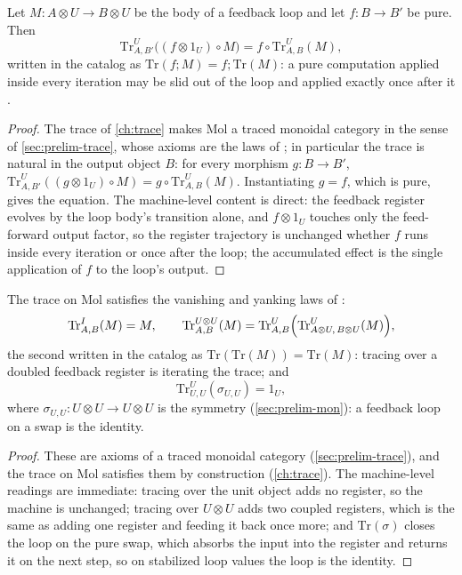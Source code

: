 \begin{theorem}[Sliding (NT34)]\label{nt:34}
Let $M : A \otimes U \to B \otimes U$ be the body of a feedback loop and let
$f : B \to B'$ be pure. Then
\[
\mathrm{Tr}^{U}_{A,B'}\bigl((f \otimes 1_U) \circ M\bigr)
= f \circ \mathrm{Tr}^{U}_{A,B}(M) ,
\]
written in the catalog as $\mathrm{Tr}(f;M) = f;\mathrm{Tr}(M)$: a pure
computation applied inside every iteration may be slid out of the loop and
applied exactly once after it \citep{joyalsv}.
\end{theorem}

\begin{proof}
The trace of \autoref{ch:trace} makes Mol a traced monoidal category in the
sense of \autoref{sec:prelim-trace}, whose axioms are the laws of
\citet{joyalsv}; in particular the trace is natural in the output object
$B$: for every morphism $g : B \to B'$,
$\mathrm{Tr}^{U}_{A,B'}((g \otimes 1_U) \circ M) = g \circ
\mathrm{Tr}^{U}_{A,B}(M)$. Instantiating $g = f$, which is pure, gives the
equation. The machine-level content is direct: the feedback register
evolves by the loop body's transition alone, and $f \otimes 1_U$ touches
only the feed-forward output factor, so the register trajectory is
unchanged whether $f$ runs inside every iteration or once after the loop;
the accumulated effect is the single application of $f$ to the loop's
output.
\end{proof}

\begin{theorem}\label{nt:35}
The trace on Mol satisfies the vanishing and yanking laws of
\citet{joyalsv}:
\[
\mathrm{Tr}^{I}_{A,B}(M) = M ,
\qquad
\mathrm{Tr}^{U \otimes U}_{A,B}(M)
= \mathrm{Tr}^{U}_{A,B}\Bigl(
  \mathrm{Tr}^{U}_{A \otimes U,\, B \otimes U}(M) \Bigr),
\]
the second written in the catalog as $\mathrm{Tr}(\mathrm{Tr}(M)) =
\mathrm{Tr}(M)$: tracing over a doubled feedback register is iterating the
trace; and
\[
\mathrm{Tr}^{U}_{U,U}(\sigma_{U,U}) = 1_U ,
\]
where $\sigma_{U,U} : U \otimes U \to U \otimes U$ is the symmetry
(\autoref{sec:prelim-mon}): a feedback loop on a swap is the identity.
\end{theorem}

\begin{proof}
These are axioms of a traced monoidal category (\autoref{sec:prelim-trace}),
and the trace on Mol satisfies them by construction (\autoref{ch:trace}).
The machine-level readings are immediate: tracing over the unit object adds
no register, so the machine is unchanged; tracing over $U \otimes U$ adds
two coupled registers, which is the same as adding one register and feeding
it back once more; and $\mathrm{Tr}(\sigma)$ closes the loop on the pure
swap, which absorbs the input into the register and returns it on the next
step, so on stabilized loop values the loop is the identity.
\end{proof}


